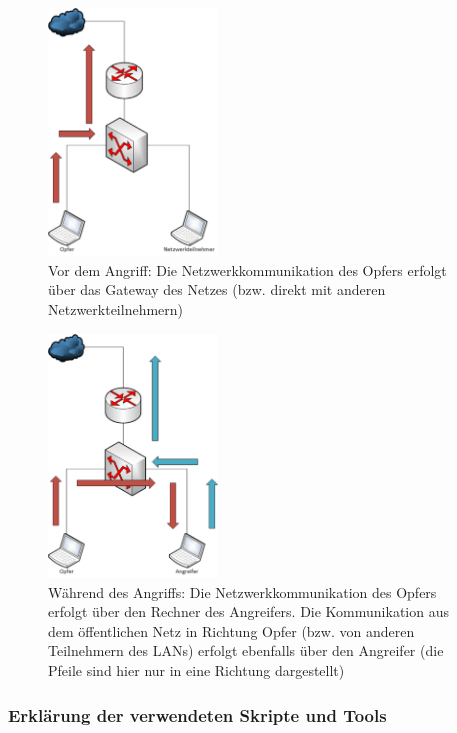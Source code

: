 \begin{figure}[h!]
	\centering
		\includegraphics[width=0.40\textwidth]{bilder/arpSpoofing/arp_soofing_before.pdf}
	\caption{Vor dem Angriff: Die Netzwerkkommunikation des Opfers erfolgt über das Gateway des Netzes (bzw. direkt mit anderen Netzwerkteilnehmern)}
	\label{fig:arp_soofing_before}
\end{figure}

\begin{figure}[h!]
	\centering
		\includegraphics[width=0.40\textwidth]{bilder/arpSpoofing/arp_soofing_after.pdf}
	\caption{Während des Angriffs: Die Netzwerkkommunikation des Opfers erfolgt über den Rechner des Angreifers. Die Kommunikation aus dem öffentlichen Netz in Richtung Opfer (bzw. von anderen Teilnehmern des LANs) erfolgt ebenfalls über den Angreifer (die Pfeile sind hier nur in eine Richtung dargestellt)}
	\label{fig:arp_soofing_after}
\end{figure}


\subsubsection*{Erklärung der verwendeten Skripte und Tools}

